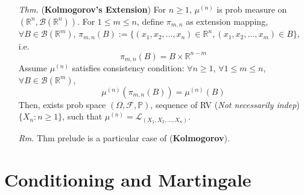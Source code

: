 \documentclass[a4paper,12pt,twoside]{book}
\begin{document}
\begin{itemize}
	\item[\textit{Thm.}] (\textbf{Kolmogorov's Extension}) For $n\geq 1$, $\mu^{(n)}$ is prob measure on $(\mathbb{R}^n, \mathscr{B}(\mathbb{R}^n))$. For $1\leq m\leq n$, define $\pi_{m,n}$ as extension mapping, $\forall B\in \mathscr{B}(\mathbb{R}^m)$, $\pi_{m, n}(B):=\{(x_1, x_2, ..., x_n)\in \mathbb{R}^n, (x_1, x_2, ..., x_m)\in B\}$, i.e.
	$$\pi_{m,n}(B)=B\times \mathbb{R}^{n-m}$$
	Assume $\mu^{(n)}$ satisfies consistency condition:\newline
	$\forall n\geq 1$, $\forall 1\leq m\leq n $, $\forall B\in \mathscr{B}(\mathbb{R}^m)$, 
	$$\mu^{(n)}(\pi_{m,n}(B))=\mu^{(n)}(B)$$
	Then, exists prob space $(\Omega, \mathcal{F}, \mathbb{P})$, sequence of RV (\textit{Not necessarily indep}) $\{X_n:n\geq 1\}$, such that $\mu^{(n)}=\mathcal{L}_{(X_1, X_2, ..., X_n)}$.

	\item[\textit{Rm.}] Thm prelude is a particular case of (\textbf{Kolmogorov}).
\end{itemize}


\chapter{Conditioning and Martingale}

\end{document}

